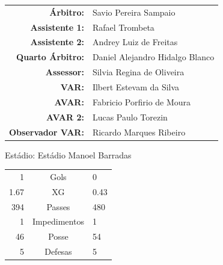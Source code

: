 \documentclass[11pt]{article}
\begin{document}
\vspace{0.5cm}
\begin{minipage}{0.65\textwidth}
\begin{center}
\begin{tabular}{rl}
\textbf{Árbitro:} & Savio Pereira Sampaio \\
\textbf{Assistente 1:} & Rafael Trombeta \\
\textbf{Assistente 2:} & Andrey Luiz de Freitas \\
\textbf{Quarto Árbitro:} & Daniel Alejandro Hidalgo Blanco \\
\textbf{Assessor:} & Silvia Regina de Oliveira \\
\textbf{VAR:} & Ilbert Estevam da Silva \\
\textbf{AVAR:} & Fabricio Porfirio de Moura \\
\textbf{AVAR 2:} & Lucas Paulo Torezin \\
\textbf{Observador VAR:} & Ricardo Marques Ribeiro \\
\end{tabular}
\end{center}
\end{minipage}
\begin{minipage}{0.3\textwidth}
Estádio: Estádio Manoel Barradas\\
\begin{tabular}{rcl}
1 & Gols & 0 \\
1.67 & XG & 0.43 \\
394 & Passes & 480 \\
1 & Impedimentos & 1 \\
46 & Posse & 54 \\
5 & Defesas & 5 \\
\end{tabular}
\end{minipage}
\newpage
\end{document}
